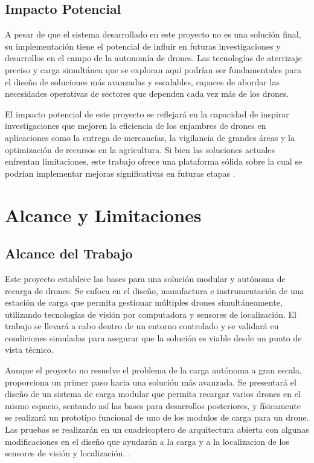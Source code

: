 \subsection{Impacto Potencial}

A pesar de que el sistema desarrollado en este proyecto no es una solución final, su implementación tiene el potencial de influir en futuras investigaciones y desarrollos en el campo de la autonomía de drones. Las tecnologías de aterrizaje preciso y carga simultánea que se exploran aquí podrían ser fundamentales para el diseño de soluciones más avanzadas y escalables, capaces de abordar las necesidades operativas de sectores que dependen cada vez más de los drones.

El impacto potencial de este proyecto se reflejará en la capacidad de inspirar investigaciones que mejoren la eficiencia de los enjambres de drones en aplicaciones como la entrega de mercancías, la vigilancia de grandes áreas y la optimización de recursos en la agricultura. Si bien las soluciones actuales enfrentan limitaciones, este trabajo ofrece una plataforma sólida sobre la cual se podrían implementar mejoras significativas en futuras etapas \cite{cite2}.

\section{Alcance y Limitaciones}

\subsection{Alcance del Trabajo}

Este proyecto establece las bases para una solución modular y autónoma de recarga de drones. Se enfoca en el diseño, manufactura e instrumentación de una estación de carga que permita gestionar múltiples drones simultáneamente, utilizando tecnologías de visión por computadora y sensores de localización. El trabajo se llevará a cabo dentro de un entorno controlado y se validará en condiciones simuladas para asegurar que la solución es viable desde un punto de vista técnico.

Aunque el proyecto no resuelve el problema de la carga autónoma a gran escala, proporciona un primer paso hacia una solución más avanzada. Se presentará el diseño de un sistema de carga modular que permita recargar varios drones en el mismo espacio, sentando así las bases para desarrollos posteriores, y físicamente se realizará un prototipo funcional de uno de los modulos de carga para un drone. Las pruebas se realizarán en un cuadricoptero de arquitectura abierta con algunas modificaciones en el diseño que ayudarán a la carga y a la localizacion de los sensores de visión y localización. \cite{cite3}.

